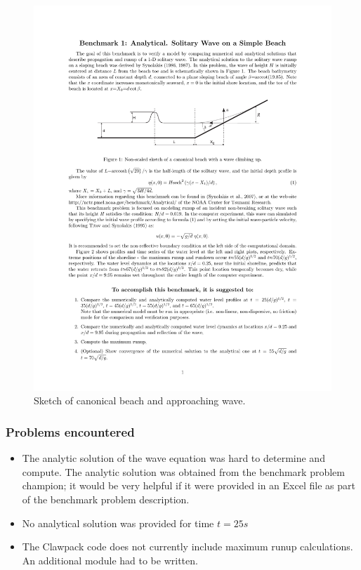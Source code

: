 \begin{figure}[ht]
\hfil\includegraphics[width=5.0in]{bp1/bp1domain}\hfil
\caption{\label{fig:bp1domain} 
Sketch of canonical beach and approaching wave.
 }
\end{figure}


\subsubsection{Problems encountered}

\begin{itemize}
\item The analytic solution of the wave equation was hard to determine and compute.  The analytic solution was obtained from the benchmark problem champion; it would be very helpful if it were provided in an Excel file as part of the benchmark problem description.  
\item No analytical solution was provided for time $t = 25s$
\item The Clawpack code does not currently include maximum runup calculations. An additional module had to be written. 
\end{itemize}

